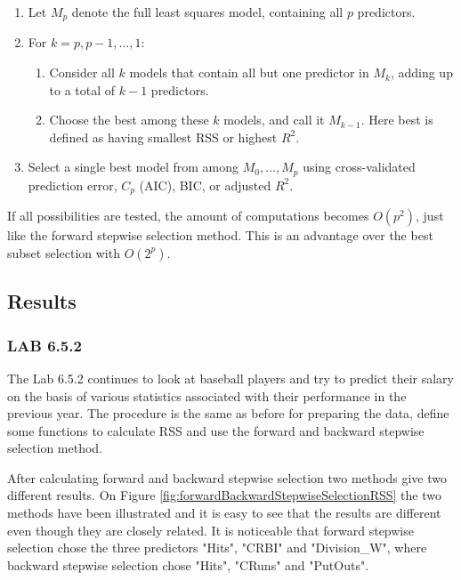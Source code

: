 \begin{enumerate}
	\item Let $M_p$ denote the full least squares model, containing all $p$ predictors.
	\item For $k=p,p-1,\dots,1$:
	\begin{enumerate}
		\item Consider all $k$ models that contain all but one predictor in $M_k$, adding up to a total of $k-1$ predictors.
		\item Choose the best among these $k$ models, and call it $M_{k-1}$. Here best is defined as having smallest RSS or highest $R^2$.
	\end{enumerate}
	\item Select a single best model from among $M_0,\dots,M_p$ using cross-validated prediction error, $C_p$ (AIC), BIC, or adjusted $R^2$. 
\end{enumerate}

If all possibilities are tested, the amount of computations becomes $O(p^2)$, just like the forward stepwise selection method. This is an advantage over the best subset selection with $O(2^p)$.

\subsection{Results}
\subsubsection*{LAB 6.5.2}
The Lab 6.5.2  continues to look at baseball players and try to predict their salary on the basis of various statistics associated with their performance in the previous year. The procedure is the same as before for preparing the data, define some functions to calculate RSS and use the forward and backward stepwise selection method.

After calculating forward and backward stepwise selection two methods give two different results. On Figure \ref{fig:forwardBackwardStepwiseSelectionRSS} the two methods have been illustrated and it is easy to see that the results are different even though they are closely related. It is noticeable that forward stepwise selection chose the three predictors "Hits", "CRBI" and "Division\_W", where backward stepwise selection chose "Hits", "CRuns" and "PutOuts".

